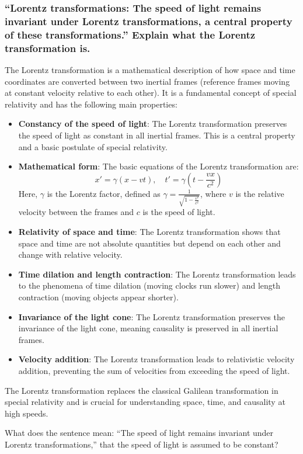 \documentclass[a4paper,12pt]{article}
\begin{document}
	\subsubsection{``Lorentz transformations: The speed of light remains invariant under Lorentz transformations, a central property of these transformations.'' Explain what the Lorentz transformation is.}
	The Lorentz transformation is a mathematical description of how space and time coordinates are converted between two inertial frames (reference frames moving at constant velocity relative to each other). It is a fundamental concept of special relativity and has the following main properties:
	\begin{itemize}
		\item \textbf{Constancy of the speed of light}: The Lorentz transformation preserves the speed of light as constant in all inertial frames. This is a central property and a basic postulate of special relativity.
		\item \textbf{Mathematical form}: The basic equations of the Lorentz transformation are:
		\[
		x' = \gamma (x - vt), \quad t' = \gamma \left(t - \frac{vx}{c^2}\right)
		\]
		Here, \( \gamma \) is the Lorentz factor, defined as \( \gamma = \frac{1}{\sqrt{1 - \frac{v^2}{c^2}}} \), where \( v \) is the relative velocity between the frames and \( c \) is the speed of light.
		\item \textbf{Relativity of space and time}: The Lorentz transformation shows that space and time are not absolute quantities but depend on each other and change with relative velocity.
		\item \textbf{Time dilation and length contraction}: The Lorentz transformation leads to the phenomena of time dilation (moving clocks run slower) and length contraction (moving objects appear shorter).
		\item \textbf{Invariance of the light cone}: The Lorentz transformation preserves the invariance of the light cone, meaning causality is preserved in all inertial frames.
		\item \textbf{Velocity addition}: The Lorentz transformation leads to relativistic velocity addition, preventing the sum of velocities from exceeding the speed of light.
	\end{itemize}
	The Lorentz transformation replaces the classical Galilean transformation in special relativity and is crucial for understanding space, time, and causality at high speeds.
	
	What does the sentence mean: ``The speed of light remains invariant under Lorentz transformations,'' that the speed of light is assumed to be constant?
	
\end{document}
